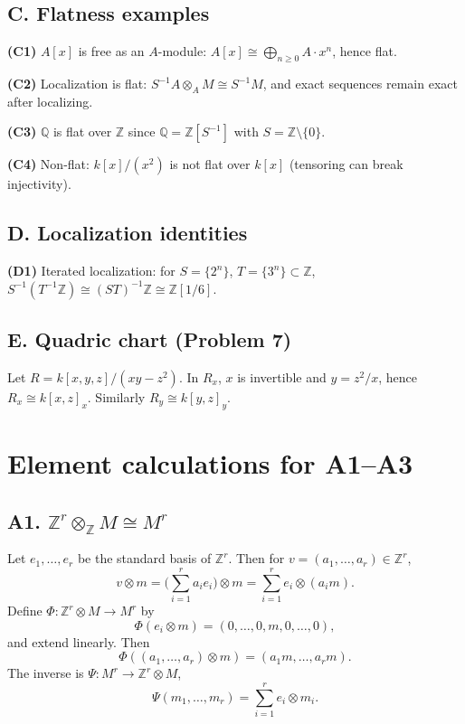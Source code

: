 \documentclass[12pt,a4paper]{article}
\theoremstyle{plain}
\theoremstyle{definition}      %
\begin{document}
	\subsection*{C. Flatness examples}
	\textbf{(C1)} \(A[x]\) is free as an \(A\)-module:
	\(A[x]\cong \bigoplus_{n\ge 0}A\cdot x^n\), hence flat.
	
	\textbf{(C2)} Localization is flat:
	\(S^{-1}A\otimes_A M\cong S^{-1}M\), and exact sequences remain exact after localizing.
	
	\textbf{(C3)} \(\mathbb Q\) is flat over \(\mathbb Z\) since \(\mathbb Q=\mathbb Z[S^{-1}]\) with \(S=\mathbb Z\setminus\{0\}\).
	
	\textbf{(C4)} Non-flat: \(k[x]/(x^2)\) is not flat over \(k[x]\) (tensoring can break injectivity).
	
	\subsection*{D. Localization identities}
	\textbf{(D1)} Iterated localization:
	for \(S=\{2^n\}\), \(T=\{3^n\}\subset \mathbb Z\),
	\(S^{-1}(T^{-1}\mathbb Z)\cong (ST)^{-1}\mathbb Z\cong \mathbb Z[1/6]\).
	
	\subsection*{E. Quadric chart (Problem 7)}
	Let \(R=k[x,y,z]/(xy-z^2)\). In \(R_x\), \(x\) is invertible and \(y=z^2/x\), hence
	\(R_x\cong k[x,z]_x\). Similarly \(R_y\cong k[y,z]_y\).
	
	\section*{Element calculations for A1--A3}
	
	\subsection*{A1. \(\mathbb Z^r\otimes_{\mathbb Z} M \cong M^r\)}
	Let \(e_1,\dots,e_r\) be the standard basis of \(\mathbb Z^r\). Then for \(v=(a_1,\dots,a_r)\in\mathbb Z^r\),
	\[
	v\otimes m=\Big(\sum_{i=1}^r a_i e_i\Big)\otimes m=\sum_{i=1}^r e_i\otimes (a_i m).
	\]
	Define \(\Phi:\mathbb Z^r\otimes M\to M^r\) by
	\[
	\Phi(e_i\otimes m)=(0,\dots,0,m,0,\dots,0),
	\]
	and extend linearly. Then
	\[
	\Phi((a_1,\dots,a_r)\otimes m)=(a_1m,\dots,a_rm).
	\]
	The inverse is \(\Psi:M^r\to \mathbb Z^r\otimes M\),
	\[
	\Psi(m_1,\dots,m_r)=\sum_{i=1}^r e_i\otimes m_i.
	\]
	
\end{document}
